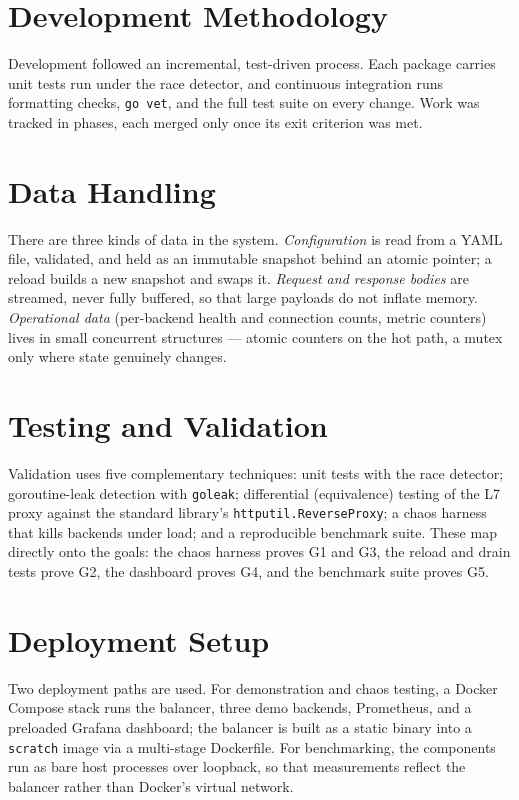 \documentclass[11pt,a4paper]{report}
\newcommand{\code}[1]{\texttt{#1}}
\begin{document}
\section{Development Methodology}
Development followed an incremental, test-driven process. Each package carries unit tests run
under the race detector, and continuous integration runs formatting checks, \code{go vet},
and the full test suite on every change. Work was tracked in phases, each merged only once its
exit criterion was met.

\section{Data Handling}
There are three kinds of data in the system. \emph{Configuration} is read from a YAML file,
validated, and held as an immutable snapshot behind an atomic pointer; a reload builds a new
snapshot and swaps it. \emph{Request and response bodies} are streamed, never fully buffered,
so that large payloads do not inflate memory. \emph{Operational data} (per-backend health and
connection counts, metric counters) lives in small concurrent structures --- atomic counters on
the hot path, a mutex only where state genuinely changes.

\section{Testing and Validation}
Validation uses five complementary techniques: unit tests with the race detector; goroutine-leak
detection with \code{goleak}; differential (equivalence) testing of the L7 proxy against the
standard library's \code{httputil.ReverseProxy}; a chaos harness that kills backends under load;
and a reproducible benchmark suite. These map directly onto the goals: the chaos harness proves
G1 and G3, the reload and drain tests prove G2, the dashboard proves G4, and the benchmark suite
proves G5.

\section{Deployment Setup}
Two deployment paths are used. For demonstration and chaos testing, a Docker Compose stack runs
the balancer, three demo backends, Prometheus, and a preloaded Grafana dashboard; the balancer
is built as a static binary into a \code{scratch} image via a multi-stage Dockerfile. For
benchmarking, the components run as bare host processes over loopback, so that measurements
reflect the balancer rather than Docker's virtual network.
\end{document}
